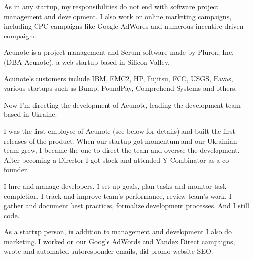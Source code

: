\documentclass[12pt]{letter}
\begin{document}
\begin{llist}
           \item As in any startup, my responsibilities do not end with software project management and development. I also work on online marketing campaigns, including CPC campaigns like Google AdWords and numerous incentive-driven campaigns.

  \endexperience


  \startexperience

           \item Acunote is a project management and Scrum software made by Pluron, Inc.
           (DBA Acunote), a web startup based in Silicon Valley.

           \item Acunote's customers include IBM, EMC2, HP, Fujitsu, FCC, USGS, Havas,
           various startups such as Bump, PoundPay, Comprehend Systems and others.

           \item Now I'm directing the development of Acunote, leading the development team based in Ukraine.

           \item I was the first employee of Acunote (see below for details) and built the first releases of the product. When our startup got momentum and our Ukrainian team grew, I became the one to direct the team and oversee the development. After becoming a Director I got stock and attended Y Combinator as a co-founder.

           \item I hire and manage developers. I set up goals, plan tasks and monitor task completion. I track and improve team's performance, review team's work. I gather and document best practices, formalize development processes. And I still code.

           \item As a startup person, in addition to management and development I also do marketing. I worked on our Google AdWords and Yandex Direct campaigns, wrote and automated autoresponder emails, did promo website SEO.

  \endexperience


  \startexperience


\end{llist}
\end{document}
